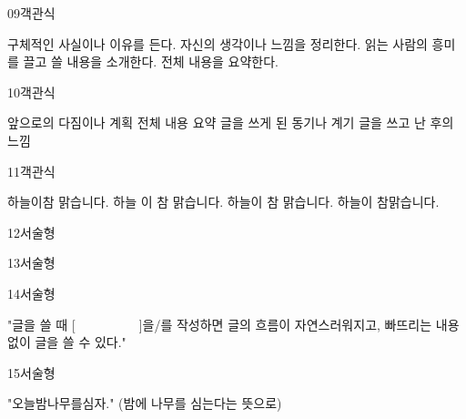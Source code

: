 \documentclass[fs11,seriesFre]{korfarm-base}
\begin{document}
\begin{kfQBlock}{09}{객관식}
\begin{kfChoices}
\kfChoice 구체적인 사실이나 이유를 든다.
\kfChoice 자신의 생각이나 느낌을 정리한다.
\kfChoice 읽는 사람의 흥미를 끌고 쓸 내용을 소개한다.
\kfChoice 전체 내용을 요약한다.
\end{kfChoices}
\end{kfQBlock}

\begin{kfQBlock}{10}{객관식}
\begin{kfChoices}
\kfChoice 앞으로의 다짐이나 계획
\kfChoice 전체 내용 요약
\kfChoice 글을 쓰게 된 동기나 계기
\kfChoice 글을 쓰고 난 후의 느낌
\end{kfChoices}
\end{kfQBlock}

\begin{kfQBlock}{11}{객관식}
\begin{kfChoices}
\kfChoice 하늘이참 맑습니다.
\kfChoice 하늘 이 참 맑습니다.
\kfChoice 하늘이 참 맑습니다.
\kfChoice 하늘이 참맑습니다.
\end{kfChoices}
\end{kfQBlock}

\begin{kfQBlock}{12}{서술형}
\end{kfQBlock}

\begin{kfQBlock}{13}{서술형}
\end{kfQBlock}

\begin{kfQBlock}{14}{서술형}
\begin{kfEvidence}"글을 쓸 때 [　　　　　]을/를 작성하면 글의 흐름이 자연스러워지고, 빠뜨리는 내용 없이 글을 쓸 수 있다."\end{kfEvidence}
\end{kfQBlock}

\begin{kfQBlock}{15}{서술형}
\begin{kfEvidence}"오늘밤나무를심자." (밤에 나무를 심는다는 뜻으로)\end{kfEvidence}
\end{kfQBlock}
\end{document}
